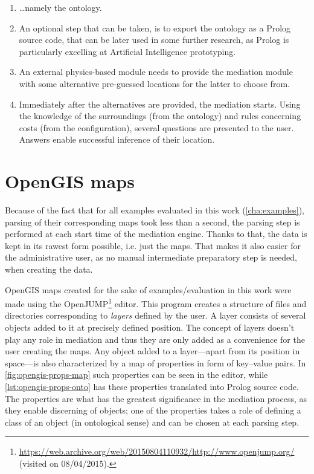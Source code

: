 \begin{enumerate}
	\item \ldots{}namely the ontology.
	\item An optional step that can be taken, is to export the ontology as a Prolog source code, that can be later used in some further research, as Prolog is particularly excelling at Artificial Intelligence prototyping.
	\item An external physics-based module needs to provide the mediation module with some alternative pre-guessed locations for the latter to choose from.
	\item Immediately after the alternatives are provided, the mediation starts. Using the knowledge of the surroundings (from the ontology) and rules concerning costs (from the configuration), several questions are presented to the user. Answers enable successful inference of their location.
\end{enumerate}

\section{OpenGIS maps}

Because of the fact that for all examples evaluated in this work (\cref{cha:examples}), parsing of their corresponding maps took less than a second, the parsing step is performed at each start time of the mediation engine. Thanks to that, the data is kept in its rawest form possible, i.e. just the maps. That makes it also easier for the administrative user, as no manual intermediate preparatory step is needed, when creating the data.

OpenGIS maps created for the sake of examples/evaluation in this work were made using the OpenJUMP\footnote{\url{https://web.archive.org/web/20150804110932/http://www.openjump.org/} (visited on 08/04/2015).} editor. This program creates a structure of files and directories corresponding to \emph{layers} defined by the user. A layer consists of several objects added to it at precisely defined position. The concept of layers doesn't play any role in mediation and thus they are only added as a convenience for the user creating the maps. Any object added to a layer---apart from its position in space---is also characterized by a map of properties in form of key--value pairs. In \cref{fig:opengis-props-map} such properties can be seen in the editor, while \cref{lst:opengis-props-onto} has these properties translated into Prolog source code. The properties are what has the greatest significance in the mediation process, as they enable discerning of objects; one of the properties takes a role of defining a class of an object (in ontological sense) and can be chosen at each parsing step.

